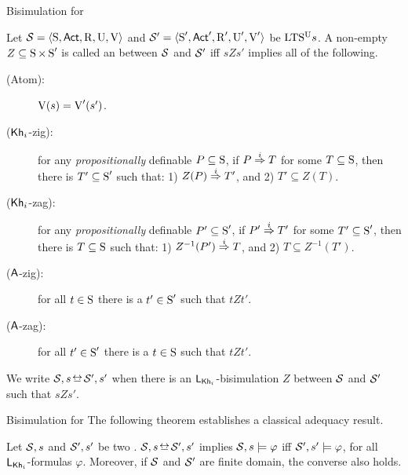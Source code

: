 \documentclass{beamer}
\begin{document}
\begin{frame}{Bisimulation for \KHilogic}
    \begin{definition}\label{def:bisim-khi}
    \begin{footnotesize}
    Let $\mathcal{S} = \langle \operatorname{S},{\rm \sf Act},\operatorname{R},\operatorname{U},\operatorname{V} \rangle$ and $\mathcal{S}' = \langle \operatorname{S}',{\rm \sf Act}',\operatorname{R}',\operatorname{U}',\operatorname{V}' \rangle$ be ${\textup{LTS$^\text{\textup{U}}$}}s$. 
    A non-empty $Z \subseteq \operatorname{S} \times \operatorname{S}'$ is called an  between $\mathcal{S}$ and $\mathcal{S}'$ iff $sZs'$ implies all of the following.
    \pause
    \begin{description} 
        \item[(Atom):] $\operatorname{V}(s)=\operatorname{V}'(s')$. \pause

        \item[(${\operatorname{\sf Kh}_i}$-zig):] for any \emph{propositionally} definable $P \subseteq \operatorname{S}$, if $P \stackrel{i}{\Rightarrow} T$ for some $T \subseteq \operatorname{S}$, then there is $T' \subseteq \operatorname{S}'$ such that: 
            1) $Z(P) \stackrel{i}{\Rightarrow} T'$, and
            2) $T' \subseteq Z(T)$.

        \item[(${\operatorname{\sf Kh}_i}$-zag):] %
        for any \emph{propositionally} definable $P' \subseteq \operatorname{S}'$, if $P' \stackrel{i}{\Rightarrow} T'$ for some $T' \subseteq \operatorname{S}'$, then there is $T \subseteq \operatorname{S}$ such that: 
            1) $Z^{-1}(P') \stackrel{i}{\Rightarrow} T$, and
            2) $T \subseteq Z^{-1}(T')$. \pause

        \item[(${\operatorname{\sf A}}$-zig):] for all $t\in\operatorname{S}$ there is a $t'\in\operatorname{S}'$ such that $tZt'$.

        \item[(${\operatorname{\sf A}}$-zag):] for all $t'\in\operatorname{S}'$ there is a $t\in\operatorname{S}$ such that $tZt'$. \pause
    \end{description}
    We write $\model,s \bisim \model',s'$ when there is an
    $\mathsf{L}_{\operatorname{\sf Kh}_i}$-bisimulation $Z$ between $\mathcal{S}$ and $\mathcal{S}'$ such that
    $sZs'$.
    \end{footnotesize}
    \end{definition}
\end{frame}


\begin{frame}{Bisimulation for \KHilogic}
The following theorem establishes a classical adequacy result. \pause

\begin{theorem}[]
\label{th:adequacy}
Let $\mathcal{S},s$ and $\mathcal{S}',s'$ be two \ultss. $\model,s\bisim\model',s'$ implies $\mathcal{S},s\models\varphi$ iff $\mathcal{S}',s'\models\varphi$, for all $\mathsf{L}_{\operatorname{\sf Kh}_i}$-formulas $\varphi$. Moreover, if $\mathcal{S}$ and $\mathcal{S}'$ are finite domain, the converse also holds.
\end{theorem}
\end{frame}
\end{document}
